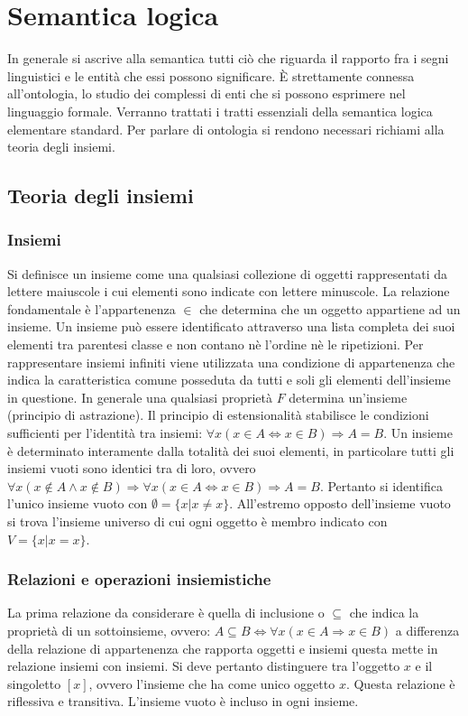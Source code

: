 \chapter{Semantica logica}
In generale si ascrive alla semantica tutti ci\`o che riguarda il rapporto fra i segni linguistici e le entit\`a che essi possono significare. \`E strettamente connessa all'ontologia, lo studio dei complessi di enti che si 
possono esprimere nel linguaggio formale. Verranno trattati i tratti essenziali della semantica logica elementare standard. Per parlare di ontologia si rendono necessari richiami alla teoria degli insiemi.
\section{Teoria degli insiemi}
\subsection{Insiemi}
Si definisce un insieme come una qualsiasi collezione di oggetti rappresentati da lettere maiuscole i cui elementi sono indicate con lettere minuscole. La relazione fondamentale \`e l'appartenenza $\in$ che 
determina che un oggetto appartiene ad un insieme. Un insieme pu\`o essere identificato attraverso una lista completa dei suoi elementi tra parentesi classe e non contano n\`e l'ordine n\`e le ripetizioni. Per 
rappresentare insiemi infiniti viene utilizzata una condizione di appartenenza che indica la caratteristica comune posseduta da tutti e soli gli elementi dell'insieme in questione. In generale una qualsiasi 
propriet\`a $F$ determina un'insieme (principio di astrazione). Il principio di estensionalit\`a stabilisce le condizioni sufficienti per l'identit\`a tra insiemi: $\forall x(x\in A\Leftrightarrow x\in B)\Rightarrow 
A=B$. Un insieme \`e determinato interamente dalla totalit\`a dei suoi elementi, in particolare tutti gli insiemi vuoti sono identici tra di loro, ovvero $\forall x(x\not\in A\land x\not\in B)\Rightarrow\forall x(x\in A 
\Leftrightarrow x\in B)\Rightarrow A=B$. Pertanto si identifica l'unico insieme vuoto con $\emptyset=\{x|x\neq x\}$. All'estremo opposto dell'insieme vuoto si trova l'insieme universo di cui ogni oggetto \`e 
membro indicato con $V=\{x|x=x\}$.
\subsection{Relazioni e operazioni insiemistiche}
La prima relazione da considerare \`e quella di inclusione o $\subseteq$ che indica la propriet\`a di un sottoinsieme, ovvero: $A\subseteq B\Leftrightarrow\forall x(x\in A\Rightarrow x\in B)$ a differenza della 
relazione di appartenenza che rapporta oggetti e insiemi questa mette in relazione insiemi con insiemi. Si deve pertanto distinguere tra l'oggetto $x$ e il singoletto $[x]$, ovvero l'insieme che ha come unico 
oggetto $x$. Questa relazione \`e riflessiva e transitiva. L'insieme vuoto \`e incluso in ogni insieme. 
